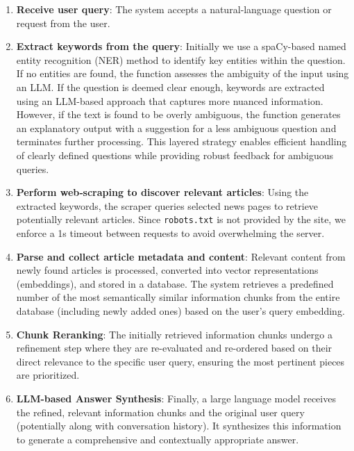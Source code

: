 \documentclass[fleqn,moreauthors,10pt]{ds_report}
\begin{document}
\begin{enumerate}
  \item \textbf{Receive user query}:  
    The system accepts a natural‑language question or request from the user.
  \item \textbf{Extract keywords from the query}:  
   Initially we use a spaCy-based named entity recognition (NER) method to identify key entities within the question. If no entities are found, the function assesses the ambiguity of the input using an LLM. If the question is deemed clear enough, keywords are extracted using an LLM-based approach that captures more nuanced information. However, if the text is found to be overly ambiguous, the function generates an explanatory output with a suggestion for a less ambiguous question and terminates further processing. This layered strategy enables efficient handling of clearly defined questions while providing robust feedback for ambiguous queries.
  
  \item \textbf{Perform web‑scraping to discover relevant articles}:  
    Using the extracted keywords, the scraper queries selected news pages to retrieve potentially relevant articles. Since \texttt{robots.txt} is not provided by the site, we enforce a 1s timeout between requests to avoid overwhelming the server.
  
  \item \textbf{Parse and collect article metadata and content}:  
    Relevant content from newly found articles is processed, converted into vector representations (embeddings), and stored in a database. The system retrieves a predefined number of the most semantically similar information chunks from the entire database (including newly added ones) based on the user's query embedding.

    \item \textbf{Chunk Reranking}: The initially retrieved information chunks undergo a refinement step where they are re-evaluated and re-ordered based on their direct relevance to the specific user query, ensuring the most pertinent pieces are prioritized.

    \item \textbf{LLM-based Answer Synthesis}: Finally, a large language model receives the refined, relevant information chunks and the original user query (potentially along with conversation history). It synthesizes this information to generate a comprehensive and contextually appropriate answer.


\end{enumerate}
\end{document}
